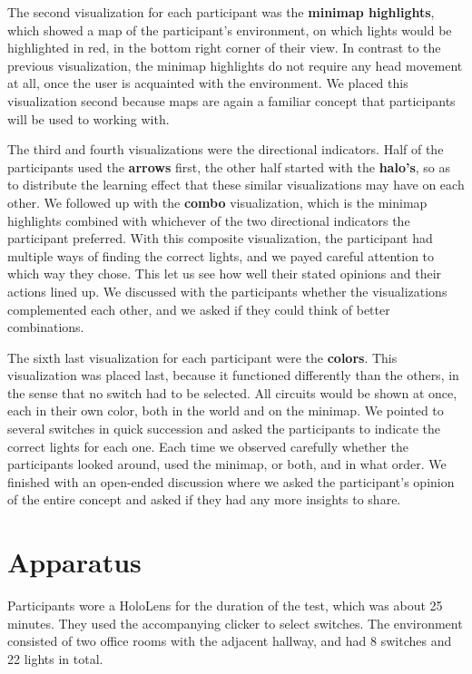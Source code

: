 The second visualization for each participant was the \textbf{minimap highlights}, which showed a map of the participant's environment, on which lights would be highlighted in red, in the bottom right corner of their view. In contrast to the previous visualization, the minimap highlights do not require any head movement at all, once the user is acquainted with the environment. We placed this visualization second because maps are again a familiar concept that participants will be used to working with.

The third and fourth visualizations were the directional indicators. Half of the participants used the \textbf{arrows} first, the other half started with the \textbf{halo's}, so as to distribute the learning effect that these similar visualizations may have on each other. We followed up with the \textbf{combo} visualization, which is the minimap highlights combined with whichever of the two directional indicators the participant preferred. With this composite visualization, the participant had multiple ways of finding the correct lights, and we payed careful attention to which way they chose. This let us see how well their stated opinions and their actions lined up. We discussed with the participants whether the visualizations complemented each other, and we asked if they could think of better combinations.

The sixth last visualization for each participant were the \textbf{colors}. This visualization was placed last, because it functioned differently than the others, in the sense that no switch had to be selected. All circuits would be shown at once, each in their own color, both in the world and on the minimap. We pointed to several switches in quick succession and asked the participants to indicate the correct lights for each one. Each time we observed carefully whether the participants looked around, used the minimap, or both, and in what order. We finished with an open-ended discussion where we asked the participant's opinion of the entire concept and asked if they had any more insights to share.

\section{Apparatus} \label{sec:user:survey:apparatus}
Participants wore a HoloLens for the duration of the test, which was about 25 minutes. They used the accompanying clicker to select switches. The environment consisted of two office rooms with the adjacent hallway, and had 8 switches and 22 lights in total.


